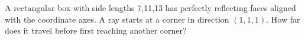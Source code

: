 A rectangular box with side lengths 7,11,13 has perfectly reflecting faces aligned with the coordinate axes. A ray starts at a corner in direction $(1,1,1)$. How far does it travel before first reaching another corner?
